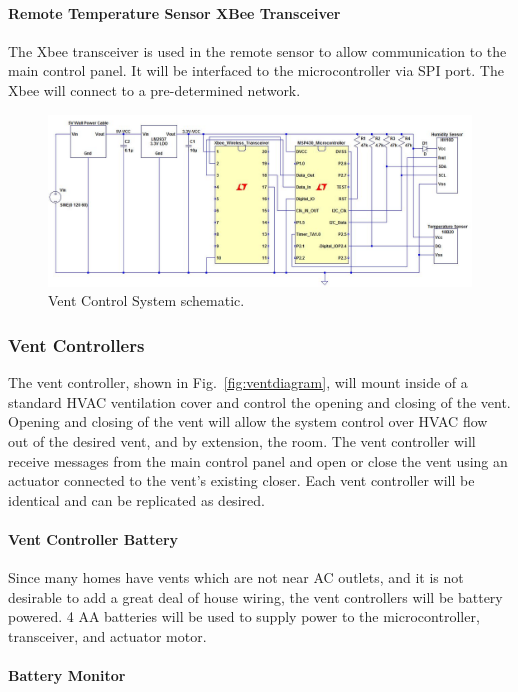 \paragraph{Remote Temperature Sensor XBee Transceiver}
The Xbee transceiver is used in the remote sensor to allow communication to the main control panel. It will be interfaced to the microcontroller via SPI port.  The Xbee will connect to a pre-determined network.

\begin{figure} [htb]
\centering
\includegraphics[width=.99\textwidth]{Vent_System.jpg}
\caption{Vent Control System schematic.}
\label{fig:Vent_System}
\end{figure}

\subsubsection{Vent Controllers}
The vent controller, shown in Fig.~\ref{fig:ventdiagram}, will mount inside of a standard HVAC ventilation cover and control the opening and closing of the vent.  Opening and closing of the vent will allow the system control over HVAC flow out of the desired vent, and by extension, the room. The vent controller will receive messages from the main control panel and open or close the vent using an actuator connected to the vent's existing closer. Each vent controller will be identical and can be replicated as desired.
\paragraph{Vent Controller Battery}
Since many homes have vents which are not near AC outlets, and it is not desirable to add a great deal of house wiring, the vent controllers will be battery powered.  4 AA batteries will be used to supply power to the microcontroller, transceiver, and actuator motor.
\paragraph{Battery Monitor}
